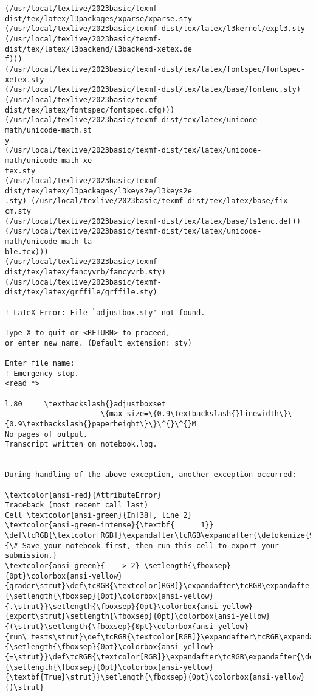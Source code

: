\documentclass[11pt]{article}
\begin{document}
\begin{Verbatim}[commandchars=\\\{\}, frame=single, framerule=2mm, rulecolor=\color{outerrorbackground}]
(/usr/local/texlive/2023basic/texmf-dist/tex/latex/l3packages/xparse/xparse.sty
(/usr/local/texlive/2023basic/texmf-dist/tex/latex/l3kernel/expl3.sty
(/usr/local/texlive/2023basic/texmf-dist/tex/latex/l3backend/l3backend-xetex.de
f)))
(/usr/local/texlive/2023basic/texmf-dist/tex/latex/fontspec/fontspec-xetex.sty
(/usr/local/texlive/2023basic/texmf-dist/tex/latex/base/fontenc.sty)
(/usr/local/texlive/2023basic/texmf-dist/tex/latex/fontspec/fontspec.cfg)))
(/usr/local/texlive/2023basic/texmf-dist/tex/latex/unicode-math/unicode-math.st
y
(/usr/local/texlive/2023basic/texmf-dist/tex/latex/unicode-math/unicode-math-xe
tex.sty
(/usr/local/texlive/2023basic/texmf-dist/tex/latex/l3packages/l3keys2e/l3keys2e
.sty) (/usr/local/texlive/2023basic/texmf-dist/tex/latex/base/fix-cm.sty
(/usr/local/texlive/2023basic/texmf-dist/tex/latex/base/ts1enc.def))
(/usr/local/texlive/2023basic/texmf-dist/tex/latex/unicode-math/unicode-math-ta
ble.tex)))
(/usr/local/texlive/2023basic/texmf-dist/tex/latex/fancyvrb/fancyvrb.sty)
(/usr/local/texlive/2023basic/texmf-dist/tex/latex/grffile/grffile.sty)

! LaTeX Error: File `adjustbox.sty' not found.

Type X to quit or <RETURN> to proceed,
or enter new name. (Default extension: sty)

Enter file name: 
! Emergency stop.
<read *> 
         
l.80     \textbackslash{}adjustboxset
                      \{max size=\{0.9\textbackslash{}linewidth\}\{0.9\textbackslash{}paperheight\}\}\^{}\^{}M
No pages of output.
Transcript written on notebook.log.


During handling of the above exception, another exception occurred:

\textcolor{ansi-red}{AttributeError}                            Traceback (most recent call last)
Cell \textcolor{ansi-green}{In[38], line 2}
\textcolor{ansi-green-intense}{\textbf{      1}} \def\tcRGB{\textcolor[RGB]}\expandafter\tcRGB\expandafter{\detokenize{95,135,135}}{\# Save your notebook first, then run this cell to export your submission.}
\textcolor{ansi-green}{----> 2} \setlength{\fboxsep}{0pt}\colorbox{ansi-yellow}{grader\strut}\def\tcRGB{\textcolor[RGB]}\expandafter\tcRGB\expandafter{\detokenize{98,98,98}}{\setlength{\fboxsep}{0pt}\colorbox{ansi-yellow}{.\strut}}\setlength{\fboxsep}{0pt}\colorbox{ansi-yellow}{export\strut}\setlength{\fboxsep}{0pt}\colorbox{ansi-yellow}{(\strut}\setlength{\fboxsep}{0pt}\colorbox{ansi-yellow}{run\_tests\strut}\def\tcRGB{\textcolor[RGB]}\expandafter\tcRGB\expandafter{\detokenize{98,98,98}}{\setlength{\fboxsep}{0pt}\colorbox{ansi-yellow}{=\strut}}\def\tcRGB{\textcolor[RGB]}\expandafter\tcRGB\expandafter{\detokenize{0,135,0}}{\setlength{\fboxsep}{0pt}\colorbox{ansi-yellow}{\textbf{True}\strut}}\setlength{\fboxsep}{0pt}\colorbox{ansi-yellow}{)\strut}


\end{Verbatim}
\end{document}
